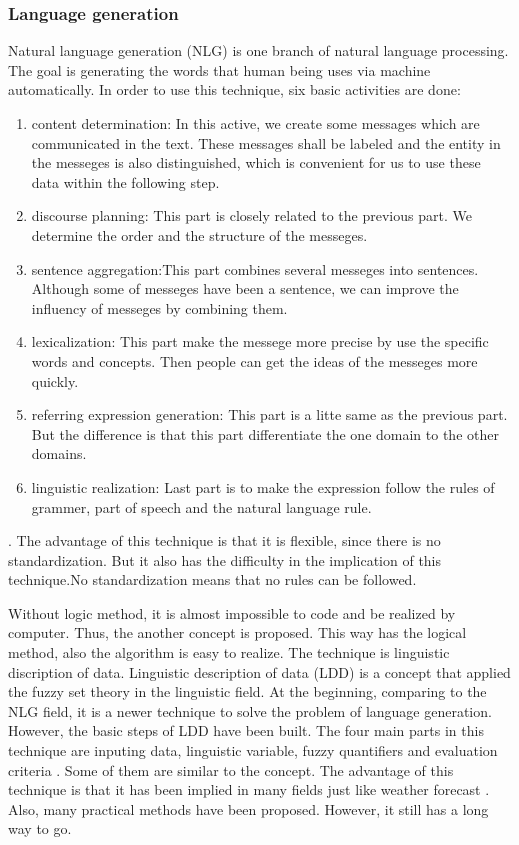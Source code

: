 \subsubsection*{Language generation}

Natural language generation (NLG) is one branch of natural language processing. 
The goal is generating the words that human being uses via machine automatically. 
In order to use this technique, six basic activities are done: 
\begin{enumerate}
	\item content determination: In this active, we create some messages which are communicated in the text. 
	These messages shall be labeled and the entity in the messeges is also distinguished, which is convenient for us to 
	use these data within the following step.
	\item discourse planning: This part is closely related to the previous part. 
	We determine the order and the structure of the messeges.
	\item sentence aggregation:This part combines several messeges into sentences. 
	Although some of messeges have been a sentence, we can improve the influency of messeges by combining them.
	\item lexicalization: This part make the messege more precise by use the specific words and concepts. 
	Then people can get the ideas of the messeges more quickly.
	\item referring expression generation: This part is a litte same as the previous part. 
	But the difference is that this part differentiate the one domain to the other domains.
	\item linguistic realization: Last part is to make the expression follow the rules of grammer, part of speech and the natural language rule.
\end{enumerate}
\cite{aramossoto2016onthe}. 
The advantage of this technique is that it is flexible, since there is no standardization. 
But it also has the difficulty in the implication of this technique.\cite{aramossoto2016onthe}No standardization means that 
no rules can be followed. 

Without logic method, it is almost impossible to code and be realized by computer.
Thus, the another concept is proposed. This way has the logical method, also the algorithm is easy to realize.
The technique is linguistic discription of data.
Linguistic description of data (LDD) is a concept that applied the fuzzy set theory in the linguistic field. 
At the beginning, comparing to the NLG field, it is a newer technique to solve the problem of language generation. 
However, the basic steps of LDD have been built. 
The four main parts in this technique are inputing data, linguistic variable, fuzzy quantifiers and evaluation criteria \cite{aramossoto2016onthe}. 
Some of them are similar to the concept. 
The advantage of this technique is that it has been implied in many fields just like weather forecast \cite{Ramos-SotoBBT14}. 
Also, many practical methods have been proposed. 
However, it still has a long way to go.

